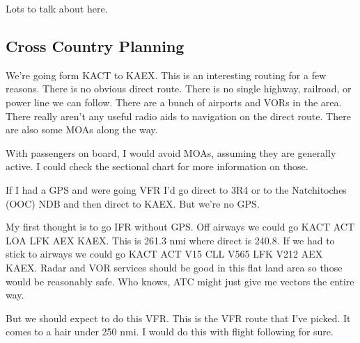 Lots to talk about here.

\subsection{Cross Country Planning}

We're going form KACT to KAEX. This is an interesting routing for a few reasons. There is no obvious direct route. There is no single highway, railroad, or power line we can follow. There are a bunch of airports and VORs in the area. There really aren't any useful radio aids to navigation on the direct route. There are also some MOAs along the way.

With passengers on board, I would avoid MOAs, assuming they are generally active. I could check the sectional chart for more information on those.

If I had a GPS and were going VFR I'd go direct to 3R4 or to the Natchitoches (OOC) NDB and then direct to KAEX. But we're no GPS.

My first thought is to go IFR without GPS. Off airways we could go KACT ACT LOA LFK AEX KAEX. This is 261.3 nmi where direct is 240.8. If we had to stick to airways we could go KACT ACT V15 CLL V565 LFK V212 AEX KAEX. Radar and VOR services should be good in this flat land area so those would be reasonably safe. Who knows, ATC might just give me vectors the entire way.

But we should expect to do this VFR. This is the VFR route that I've picked. It comes to a hair under 250 nmi. I would do this with flight following for sure.

